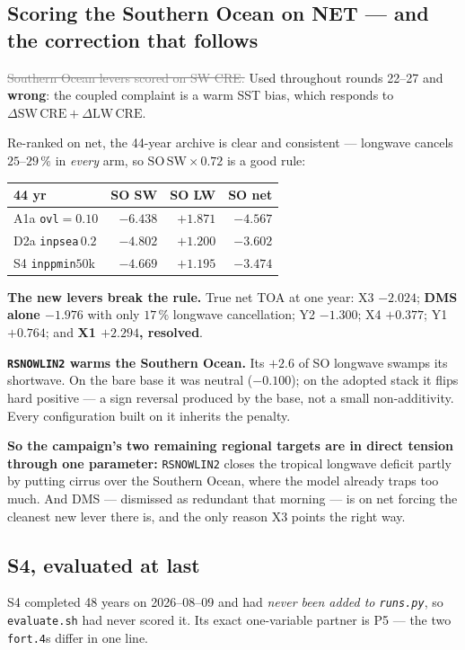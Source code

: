 \documentclass[10pt]{article}
\newcommand{\dead}[1]{\textcolor{gray}{\sout{#1}}}
\begin{document}
\subsection{Scoring the Southern Ocean on NET --- and the correction that
follows}\label{sub:r27net}
\dead{Southern Ocean levers scored on SW CRE.} Used throughout rounds 22--27 and
\textbf{wrong}: the coupled complaint is a warm SST bias, which responds to
$\Delta\mathrm{SW\,CRE}+\Delta\mathrm{LW\,CRE}$.

Re-ranked on net, the 44-year archive is clear and consistent --- longwave cancels
$25$--$29\,\%$ in \emph{every} arm, so $\mathrm{SO\,SW}\times0.72$ is a good rule:

\begin{center}\footnotesize
\begin{tabular}{l r r r}
\toprule
44 yr & SO SW & SO LW & \textbf{SO net} \\
\midrule
A1a \texttt{ovl}$=0.10$ & $-6.438$ & $+1.871$ & $\mathbf{-4.567}$ \\
D2a \texttt{inpsea}$\,0.2$ & $-4.802$ & $+1.200$ & $-3.602$ \\
S4 \texttt{inppmin}$50$k & $-4.669$ & $+1.195$ & $-3.474$ \\
\bottomrule
\end{tabular}
\end{center}

\noindent \textbf{The new levers break the rule.} True net TOA at one year:
X3 $-2.024$; \textbf{DMS alone $-1.976$} with only $17\,\%$ longwave cancellation;
Y2 $-1.300$; X4 $\mathbf{+0.377}$; Y1 $\mathbf{+0.764}$; and
\textbf{X1 $\mathbf{+2.294}$, resolved}.

\textbf{\texttt{RSNOWLIN2} warms the Southern Ocean.} Its $+2.6$ of SO longwave swamps its
shortwave. On the bare base it was neutral ($-0.100$); on the adopted stack it flips hard
positive --- a sign reversal produced by the base, not a small non-additivity. Every
configuration built on it inherits the penalty.

\textbf{So the campaign's two remaining regional targets are in direct tension through one
parameter:} \texttt{RSNOWLIN2} closes the tropical longwave deficit partly by putting
cirrus over the Southern Ocean, where the model already traps too much. And DMS ---
dismissed as redundant that morning --- is on net forcing the cleanest new lever there is,
and the only reason X3 points the right way.

\subsection{S4, evaluated at last}\label{sub:r27s4}
S4 completed 48 years on 2026--08--09 and had \emph{never been added to
\texttt{runs.py}}, so \texttt{evaluate.sh} had never scored it. Its exact one-variable
partner is P5 --- the two \texttt{fort.4}s differ in one line.
\end{document}
